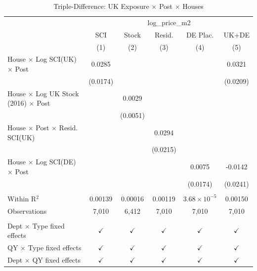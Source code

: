
\begin{table}[htbp]
   \caption{\label{tab:triple} Triple-Difference: UK Exposure $\times$ Post $\times$ Houses}
   \bigskip
   \centering
   \begin{tabular}{lccccc}
      \toprule
       & \multicolumn{5}{c}{log\_price\_m2}\\
                                                         & SCI           & Stock         & Resid.        & DE Plac.              & UK+DE \\   
                                                         & (1)           & (2)           & (3)           & (4)                   & (5)\\  
      \midrule 
      House $\times$ Log SCI(UK) $\times$ Post           & 0.0285        &               &               &                       & 0.0321\\   
                                                         & (0.0174)      &               &               &                       & (0.0209)\\   
      House $\times$ Log UK Stock (2016) $\times$ Post   &               & 0.0029        &               &                       &   \\   
                                                         &               & (0.0051)      &               &                       &   \\   
      House $\times$ Post $\times$ Resid. SCI(UK)        &               &               & 0.0294        &                       &   \\   
                                                         &               &               & (0.0215)      &                       &   \\   
      House $\times$ Log SCI(DE) $\times$ Post           &               &               &               & 0.0075                & -0.0142\\   
                                                         &               &               &               & (0.0174)              & (0.0241)\\   
       \\
      Within R$^2$                                       & 0.00139       & 0.00016       & 0.00119       & $3.68\times 10^{-5}$  & 0.00150\\  
      Observations                                       & 7,010         & 6,412         & 7,010         & 7,010                 & 7,010\\  
       \\
      Dept $\times$ Type fixed effects                   & $\checkmark$  & $\checkmark$  & $\checkmark$  & $\checkmark$          & $\checkmark$\\   
      QY $\times$ Type fixed effects                     & $\checkmark$  & $\checkmark$  & $\checkmark$  & $\checkmark$          & $\checkmark$\\   
      Dept $\times$ QY fixed effects                     & $\checkmark$  & $\checkmark$  & $\checkmark$  & $\checkmark$          & $\checkmark$\\   
      \bottomrule
   \end{tabular}
\end{table}


